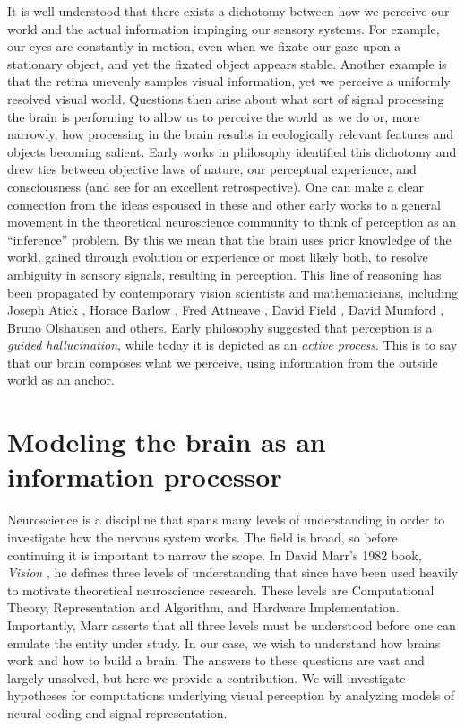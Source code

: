 It is well understood that there exists a dichotomy between how we perceive our world and the actual information impinging our sensory systems. For example, our eyes are constantly in motion, even when we fixate our gaze upon a stationary object, and yet the fixated object appears stable. Another example is that the retina unevenly samples visual information, yet we perceive a uniformly resolved visual world. Questions then arise about what sort of signal processing the brain is performing to allow us to perceive the world as we do or, more narrowly, how processing in the brain results in ecologically relevant features and objects becoming salient. Early works in philosophy identified this dichotomy and drew ties between objective laws of nature, our perceptual experience, and consciousness \parencite{kant1790critique, helmholtz1878facts} (and see \parencite{westheimer2008helmholtz} for an excellent retrospective). One can make a clear connection from the ideas espoused in these and other early works to a general movement in the theoretical neuroscience community to think of perception as an ``inference'' problem. By this we mean that the brain uses prior knowledge of the world, gained through evolution or experience or most likely both, to resolve ambiguity in sensory signals, resulting in perception. This line of reasoning has been propagated by contemporary vision scientists and mathematicians, including Joseph Atick \citeyearpar{atick1990towards}, Horace Barlow \citeyearpar{barlow2001redundancy}, Fred Attneave \citeyearpar{attneave1954some}, David Field \citeyearpar{field1994goal}, David Mumford \citeyearpar{mumford1994pattern}, Bruno Olshausen \citeyearpar{olshausen2013perception} and others. Early philosophy suggested that perception is a \textit{guided hallucination}, while today it is depicted as an \textit{active process}. This is to say that our brain composes what we perceive, using information from the outside world as an anchor.


\section{Modeling the brain as an information processor}
Neuroscience is a discipline that spans many levels of understanding in order to investigate how the nervous system works. The field is broad, so before continuing it is important to narrow the scope. In David Marr's 1982 book, \textit{Vision} \citeyearpar{marr1982vision}, he defines three levels of understanding that since have been used heavily to motivate theoretical neuroscience research. These levels are Computational Theory, Representation and Algorithm, and Hardware Implementation. Importantly, Marr asserts that all three levels must be understood before one can emulate the entity under study. In our case, we wish to understand how brains work and how to build a brain. The answers to these questions are vast and largely unsolved, but here we provide a contribution. We will investigate hypotheses for computations underlying visual perception by analyzing models of neural coding and signal representation.

